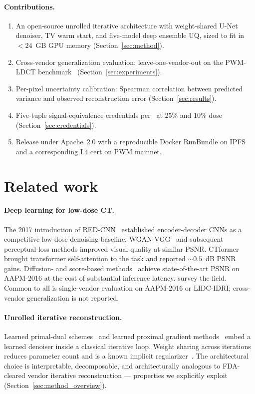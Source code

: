\documentclass{article}  %
\begin{document}
\paragraph{Contributions.}
\begin{enumerate}
    \item An open-source unrolled iterative architecture with weight-shared U-Net denoiser, TV warm start, and five-model deep ensemble UQ, sized to fit in $< 24$~GB GPU memory (Section~\ref{sec:method}).
    \item Cross-vendor generalization evaluation: leave-one-vendor-out on the PWM-LDCT benchmark~\citep{ws1dataset} (Section~\ref{sec:experiments}).
    \item Per-pixel uncertainty calibration: Spearman correlation between predicted variance and observed reconstruction error (Section~\ref{sec:results}).
    \item Five-tuple signal-equivalence credentials per~\citet{ws2framework} at 25\% and 10\% dose (Section~\ref{sec:credentials}).
    \item Release under Apache~2.0 with a reproducible Docker RunBundle on IPFS and a corresponding L4 cert on PWM mainnet.
\end{enumerate}

\section{Related work}
\label{sec:related_work}

\paragraph{Deep learning for low-dose CT.} The 2017 introduction of RED-CNN~\citep{chen2017redcnn} established encoder-decoder CNNs as a competitive low-dose denoising baseline. WGAN-VGG~\citep{yang2018ctgan} and subsequent perceptual-loss methods improved visual quality at similar PSNR. CTformer~\citep{wang2023ctformer} brought transformer self-attention to the task and reported $\sim 0.5$~dB PSNR gains. Diffusion- and score-based methods~\citep{liu2024diffusion} achieve state-of-the-art PSNR on AAPM-2016 at the cost of substantial inference latency. \citet{wang2020deeplearningreview} survey the field. Common to all is single-vendor evaluation on AAPM-2016 or LIDC-IDRI; cross-vendor generalization is not reported.

\paragraph{Unrolled iterative reconstruction.} Learned primal-dual schemes~\citep{adler2018learned} and learned proximal gradient methods~\citep{mardani2018neural} embed a learned denoiser inside a classical iterative loop. Weight sharing across iterations reduces parameter count and is a known implicit regularizer~\citep{adler2018learned}. The architectural choice is interpretable, decomposable, and architecturally analogous to FDA-cleared vendor iterative reconstruction --- properties we explicitly exploit (Section~\ref{sec:method_overview}).
\end{document}
